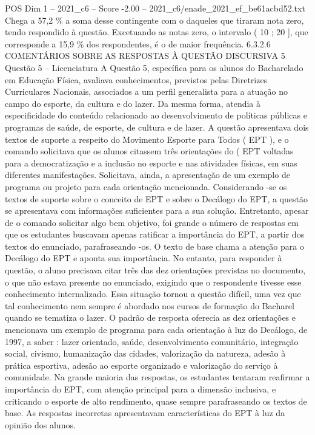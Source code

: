 \begin{textsample}{POS Dim 1 – 2021\_c6 – Score -2.00 – 2021\_c6/enade\_2021\_ef\_be61acbd52.txt}
Chega a 57,2 \% a soma desse contingente com o daqueles que tiraram nota zero, tendo respondido à questão.
Excetuando as notas zero, o intervalo ( 10 ; 20 ], que corresponde a 15,9 \% dos respondentes, é o de maior frequência. 6.3.2.6 COMENTÁRIOS SOBRE AS RESPOSTAS À QUESTÃO DISCURSIVA 5 Questão 5 – Licenciatura A Questão 5, específica para os alunos do Bacharelado em Educação Física, avaliava conhecimentos, previstos pelas Diretrizes Curriculares Nacionais, associados a um perfil generalista para a atuação no campo do esporte, da cultura e do lazer.
Da mesma forma, atendia à especificidade do conteúdo relacionado ao desenvolvimento de políticas públicas e programas de saúde, de esporte, de cultura e de lazer.
A questão apresentava dois textos de suporte a respeito do Movimento Esporte para Todos ( EPT ), e o comando solicitava que os alunos citassem três orientações do ( EPT voltadas para a democratização e a inclusão no esporte e nas atividades físicas, em suas diferentes manifestações.
Solicitava, ainda, a apresentação de um exemplo de programa ou projeto para cada orientação mencionada.
Considerando -se os textos de suporte sobre o conceito de EPT e sobre o Decálogo do EPT, a questão se apresentava com informações suficientes para a sua solução.
Entretanto, apesar de o comando solicitar algo bem objetivo, foi grande o número de respostas em que os estudantes buscavam apenas ratificar a importância do EPT, a partir dos textos do enunciado, parafraseando -os.
O texto de base chama a atenção para o Decálogo do EPT e aponta sua importância.
No entanto, para responder à questão, o aluno precisava citar três das dez orientações previstas no documento, o que não estava presente no enunciado, exigindo que o respondente tivesse esse conhecimento internalizado.
Essa situação tornou a questão difícil, uma vez que tal conhecimento nem sempre é abordado nos cursos de formação do Bacharel quando se tematiza o lazer.
O padrão de resposta oferecia as dez orientações e mencionava um exemplo de programa para cada orientação à luz do Decálogo, de 1997, a saber : lazer orientado, saúde, desenvolvimento comunitário, integração social, civismo, humanização das cidades, valorização da natureza, adesão à prática esportiva, adesão ao esporte organizado e valorização do serviço à comunidade.
Na grande maioria das respostas, os estudantes tentaram reafirmar a importância do EPT, com atenção principal para a dimensão inclusiva, e criticando o esporte de alto rendimento, quase sempre parafraseando os textos de base.
As respostas incorretas apresentavam características do EPT à luz da opinião dos alunos.

\end{textsample}
